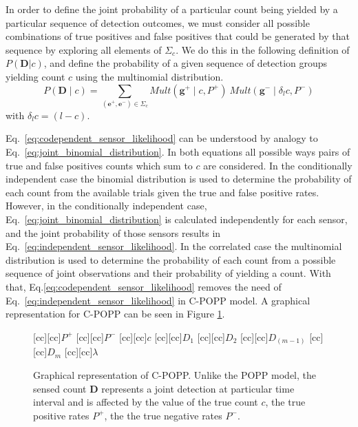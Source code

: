 In order to define the joint probability of a particular count being yielded by a particular sequence of detection outcomes, we must consider all possible combinations of true positives and false positives that could be generated by that sequence by exploring all elements of $\Sigma_c$. We do this in the following definition of $P(\mathbf{D} | c)$, and define the probability of a given sequence of detection groups yielding count $c$ using the multinomial distribution.
\begin{equation}
\label{eq:codependent_sensor_likelihood}
P(\mathbf{D} \mid c) = \sum\limits_{(\mathbf{e}^+, \mathbf{e}^-) \in \Sigma_c} Mult(\mathbf{g}^+ \mid c, P^+) ~ Mult(\mathbf{g}^- \mid \delta_l c, P^-)
\end{equation}
\noindent with $\delta_l c = (l - c)$.

Eq.~\ref{eq:codependent_sensor_likelihood} can be understood by analogy to Eq.~\ref{eq:joint_binomial_distribution}. In both equations all possible ways pairs of true and false positives counts which sum to $c$ are considered. In the conditionally independent case the binomial distribution is used to determine the probability of each count from the available trials given the true and false positive rates. However, in the conditionally independent case, Eq.~\ref{eq:joint_binomial_distribution} is calculated independently for each sensor, and the joint probability of those sensors results in Eq.~\ref{eq:independent_sensor_likelihood}. In the correlated case the multinomial distribution is used to determine the probability of each count from a possible sequence of joint observations and their probability of yielding a count. With that, Eq.\ref{eq:codependent_sensor_likelihood} removes the need of Eq.~\ref{eq:independent_sensor_likelihood} in C-POPP model. A graphical representation for C-POPP can be seen in Figure \ref{fig:gm_cpopp}.

\begin{figure}[t!]
	\centering
	[cc][cc]{$P^+$}
	[cc][cc]{$P^-$}
	[cc][cc]{$c$}
	[cc][cc]{$D_{1}$}
	[cc][cc]{$D_{2}$}
	[cc][cc]{$D_{(m-1)}$}
	[cc][cc]{$D_{m}$}
	[cc][cc]{$\lambda$}
	\caption{Graphical representation of C-POPP. Unlike the POPP model, the sensed count $\mathbf{D}$ represents a joint detection at particular time interval and is affected by the value of the true count $c$, the true positive rates $P^+$, the the true negative rates $P^-$.}
	\label{fig:gm_cpopp}
\end{figure}

